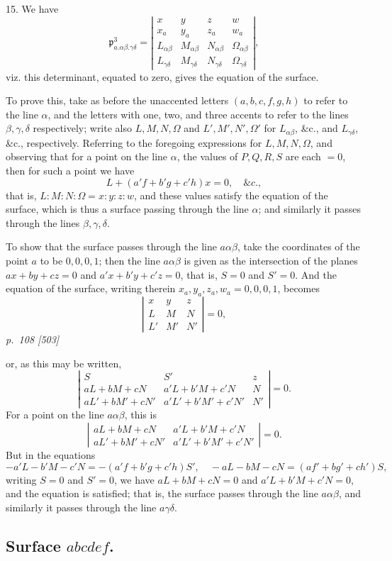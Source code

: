 \documentclass[11pt,a4paper]{article}
\newcommand{\sourcepage}[2]{%
  \bigskip
  \noindent\textit{p.~#1 [#2]}%
  \par\smallskip
}
\newcommand{\Det}[1]{\left|\begin{matrix}#1\end{matrix}\right|}
\newcommand{\p}{\mathfrak p}
\begin{document}
15. We have
\[
\p^3_{a.\alpha\beta.\gamma\delta}
=\Det{
x&y&z&w\\
x_a&y_a&z_a&w_a\\
L_{\alpha\beta}&M_{\alpha\beta}&N_{\alpha\beta}&\Omega_{\alpha\beta}\\
L_{\gamma\delta}&M_{\gamma\delta}&N_{\gamma\delta}&\Omega_{\gamma\delta}},
\]
viz. this determinant, equated to zero, gives the equation of the surface.

To prove this, take as before the unaccented letters $(a,b,c,f,g,h)$ to refer to
the line $\alpha$, and the letters with one, two, and three accents to refer to the
lines $\beta,\gamma,\delta$ respectively; write also $L,M,N,\Omega$ and
$L',M',N',\Omega'$ for $L_{\alpha\beta}$, \&c., and $L_{\gamma\delta}$, \&c.,
respectively. Referring to the foregoing expressions for $L,M,N,\Omega$, and observing
that for a point on the line $\alpha$, the values of $P,Q,R,S$ are each $=0$, then
for such a point we have
\[
L+(a'f+b'g+c'h)x=0,\quad \&c.,
\]
that is, $L:M:N:\Omega=x:y:z:w$, and these values satisfy the equation of the
surface, which is thus a surface passing through the line $\alpha$; and similarly it
passes through the lines $\beta,\gamma,\delta$.

To show that the surface passes through the line $a\alpha\beta$, take the coordinates
of the point $a$ to be $0,0,0,1$; then the line $a\alpha\beta$ is given as the
intersection of the planes $ax+by+cz=0$ and $a'x+b'y+c'z=0$, that is, $S=0$ and
$S'=0$. And the equation of the surface, writing therein $x_a,y_a,z_a,w_a=0,0,0,1$,
becomes
\[
\Det{x&y&z\\ L&M&N\\ L'&M'&N'}=0,
\]
\sourcepage{108}{503}
or, as this may be written,
\[
\Det{
S&S'&z\\
aL+bM+cN&a'L+b'M+c'N&N\\
aL'+bM'+cN'&a'L'+b'M'+c'N'&N'}=0.
\]
For a point on the line $a\alpha\beta$, this is
\[
\Det{
aL+bM+cN&a'L+b'M+c'N\\
aL'+bM'+cN'&a'L'+b'M'+c'N'}=0.
\]
But in the equations
\[
-a'L-b'M-c'N=-(a'f+b'g+c'h)S',
\quad
-aL-bM-cN=(af'+bg'+ch')S,
\]
writing $S=0$ and $S'=0$, we have
$aL+bM+cN=0$ and $a'L+b'M+c'N=0$, and the equation is satisfied; that is, the
surface passes through the line $a\alpha\beta$, and similarly it passes through the
line $a\gamma\delta$.

\subsection*{Surface $abcdef$.}
\end{document}

